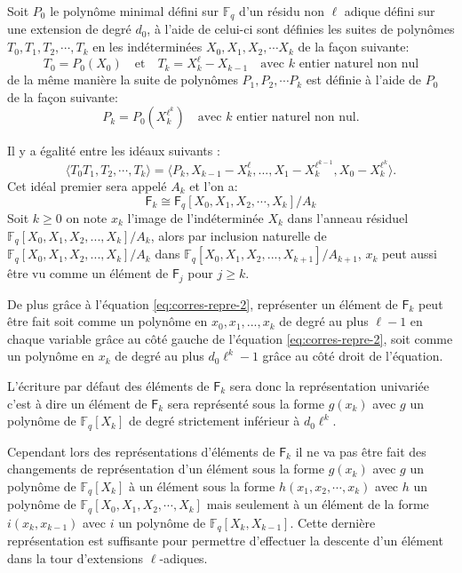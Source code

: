 \documentclass[10pt,a4paper]{book}
\theoremstyle{plain}
\theoremstyle{definition}
\theoremstyle{definition}
\theoremstyle{definition}
\theoremstyle{definition}
\theoremstyle{remark}
\theoremstyle{remark}
\theoremstyle{definition}
\begin{document}
Soit $P_0$ le polynôme minimal défini sur $\mathbb{F}_q$ d'un résidu non $\ell$ adique défini sur une extension de degré $d_0$, à l'aide de celui-ci sont définies les suites de polynômes $T_0,T_1,T_2,\cdots, T_k$ en les indéterminées $X_0,X_1,X_2, \cdots X_k$ de la façon suivante:
\[
T_0=P_0(X_0) \quad \text{et} \quad T_k=X_k^{\ell}-X_{k-1} \quad \text{avec $k$ entier naturel non nul}
\]  de la même manière la suite de polynômes $P_1,P_2, \cdots P_k$ est définie à l'aide de $P_0$ de la façon suivante:
\[
P_k=P_0(X_k^{\ell^k}) \quad \text{avec $k$ entier naturel non nul.} 
\]

Il y a égalité entre les idéaux suivants :
\begin{equation}
\label{eq:corres-repre-2}
\langle T_0 T_1, T_2, \cdots, T_k \rangle = \langle P_k, X_{k-1}-X_k^{\ell}, ..., X_1-X_{k}^{\ell^{k-1}}, X_0-X_k^{\ell^k} \rangle.
\end{equation}
Cet idéal premier sera appelé $A_k$ et l'on a:
\[
\mathsf{F}_k \cong \mathsf{F}_q[X_0,X_1,X_2,\cdots,X_k]/A_k
\]
Soit $k \geqslant 0$  on note $x_k$ l'image de l'indéterminée $X_k$ dans l'anneau résiduel $\mathbb{F}_q[X_0,X_1,X_2, ...,X_k]/A_k$, alors par inclusion naturelle de $\mathbb{F}_q[X_0,X_1,X_2, ...,X_k]/A_k$ dans $\mathbb{F}_q[X_0,X_1,X_2, ...,X_{k+1}]/A_{k+1}$, $x_k$ peut aussi être vu comme un élément de $\mathsf{F}_{j}$ pour $j \geqslant k$.

De plus grâce à l'équation \eqref{eq:corres-repre-2}, représenter un élément de $\mathsf{F}_k$ peut être fait soit comme un polynôme en $x_0,x_1, ..., x_k$ de degré au plus $\ell-1$ en chaque variable grâce au côté gauche de l'équation \eqref{eq:corres-repre-2}, soit comme un polynôme en $x_k$ de degré au plus $d_0\ell^k-1$ grâce au côté droit de l'équation.

L'écriture par défaut des éléments de $\mathsf{F}_k$ sera donc la représentation univariée c'est à dire un élément de $\mathsf{F}_k$ sera représenté sous la forme $g(x_k)$ avec $g$ un polynôme de $\mathbb{F}_q[X_k]$ de degré strictement inférieur à $d_0\ell^k$. 

Cependant lors des représentations d'éléments de $\mathsf{F}_k$ il ne va pas être fait des changements de représentation d'un élément sous la forme $g(x_k)$ avec $g$ un polynôme de $\mathbb{F}_q[X_k]$ à un élément sous la forme $h(x_1,x_2,\cdots,x_k)$ avec $h$ un polynôme de $\mathbb{F}_q[X_0,X_1,X_2,\cdots,X_k]$ mais seulement à un élément de la forme $i(x_k,x_{k-1})$ avec $i$ un polynôme de $\mathbb{F}_q[X_k,X_{k-1}]$. Cette dernière représentation est suffisante pour permettre d'effectuer la descente d'un élément dans la tour d'extensions $\ell$-adiques.
\end{document}

